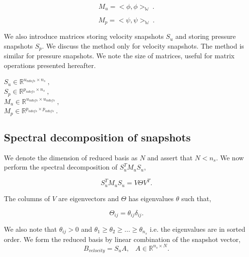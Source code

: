 \documentclass[a4paper,oneside,openright,spanish,english]{book}
\begin{document}
\begin{equation}
M_u = <\phi,\phi>_{\mathbb{W}} \ .
\end{equation}

\begin{equation}
M_p = <\psi,\psi>_{\mathbb{W}} \ .
\end{equation}

We also introduce matrices storing velocity snapshots $S_u$ and storing pressure snapshots $S_p$. We discuss the method only for velocity snapshots. The method is similar for pressure snapshots. We note the size of matrices, useful for matrix operations presented hereafter.

\begin{center}

$S_u \in \mathbb{R}^{u_{ndofs} \times n_s} \ ,$\\
$S_p \in \mathbb{R}^{p_{ndofs} \times n_s} \ ,$\\
$M_u \in \mathbb{R}^{u_{ndofs} \times u_{ndofs}} \ ,$\\
$M_p \in \mathbb{R}^{p_{ndofs} \times p_{ndofs}} \ .$\\

\end{center}

\subsection{Spectral decomposition of snapshots}

We denote the dimension of reduced basis as $N$ and assert that $N < n_s$. We now perform the spectral decomposition of $S_u^TM_uS_u$,

\begin{equation}
S_u^TM_uS_u = V \Theta V^T \textrm{.}
\end{equation}

The columns of $V$ are eigenvectors and $\Theta$ has eigenvalues $\theta$ such that,

\begin{equation}
\Theta_{ij} = \theta_{ij} \delta_{ij} \textrm{.}
\end{equation}

We also note that $\theta_{ij} > 0$ and $\theta_1 \geq \theta_2 \geq ... \geq \theta_{n_s}$ i.e. the eigenvalues are in sorted order. We form the reduced basis by linear combination of the snapshot vector,
\begin{equation}
B_{velocity} = S_u A \textrm{,} \quad A \in \mathbb{R}^{n_s \times N} \textrm{.}
\end{equation}
\end{document}
